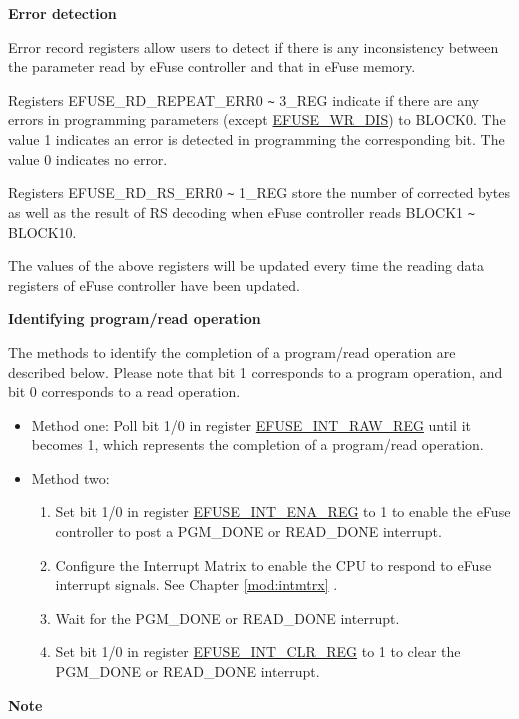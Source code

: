 \documentclass[main\_\_EN.tex]{subfiles}
\begin{document}
{\bfseries Error detection}

Error record registers allow users to detect if there is any inconsistency between the parameter read by eFuse controller and that in eFuse memory.

Registers EFUSE\_RD\_REPEAT\_ERR0 \verb+~+ 3\_REG indicate if there are any errors in programming parameters (except \hyperref[fielddesc:EFUSEWRDIS]{EFUSE\_WR\_DIS}) to BLOCK0. The value 1 indicates an error is detected in programming the corresponding bit. The value 0 indicates no error.

Registers EFUSE\_RD\_RS\_ERR0 \verb+~+ 1\_REG store the number of corrected bytes as well as the result of RS decoding when eFuse controller reads BLOCK1 \verb+~+ BLOCK10.

The values of the above registers will be updated every time the reading data registers of eFuse controller have been updated.

{\bfseries Identifying program/read operation}

    The methods to identify the completion of a program/read operation are described below. Please note that bit 1 corresponds to a program operation, and bit 0 corresponds to a read operation.
    \begin{itemize}
    \item Method one: Poll bit 1/0 in register \hyperref[regdesc:EFUSEINTRAWREG]{EFUSE\_INT\_RAW\_REG} until it becomes 1, which represents the completion of a program/read operation.
    \item Method two:
        \begin{enumerate}
            \item Set bit 1/0 in register \hyperref[regdesc:EFUSEINTENAREG]{EFUSE\_INT\_ENA\_REG} to 1 to enable the eFuse controller to post a PGM\_DONE or READ\_DONE interrupt.
            \item Configure the Interrupt Matrix to enable the CPU to respond to eFuse interrupt signals. See Chapter \ref{mod:intmtrx} \textit{}.
            \item Wait for the PGM\_DONE or READ\_DONE interrupt.
            \item Set bit 1/0 in register \hyperref[regdesc:EFUSEINTCLRREG]{EFUSE\_INT\_CLR\_REG} to 1 to clear the PGM\_DONE or READ\_DONE interrupt.
    \end{enumerate}
\end{itemize}


{\bfseries Note}
\end{document}
